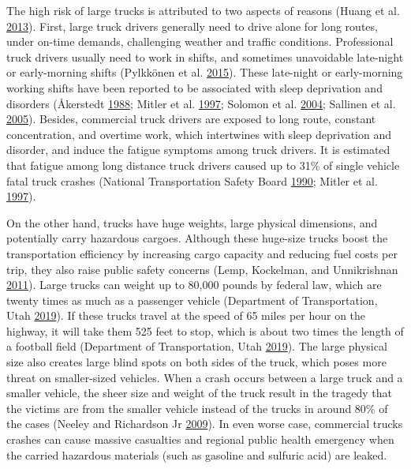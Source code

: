 \documentclass[12pt]{book}
\numberwithin{equation}{chapter}
\begin{document}
The high risk of large trucks is attributed to two aspects of reasons (Huang et al. \protect\hyperlink{ref-huang2013development}{2013}). First, large truck drivers generally need to drive alone for long routes, under on-time demands, challenging weather and traffic conditions. Professional truck drivers usually need to work in shifts, and sometimes unavoidable late-night or early-morning shifts (Pylkkönen et al. \protect\hyperlink{ref-pylkkonen2015sleepiness}{2015}). These late-night or early-morning working shifts have been reported to be associated with sleep deprivation and disorders (Åkerstedt \protect\hyperlink{ref-aakerstedt1988sleepiness}{1988}; Mitler et al. \protect\hyperlink{ref-mitler1997sleep}{1997}; Solomon et al. \protect\hyperlink{ref-solomon2004healthcare}{2004}; Sallinen et al. \protect\hyperlink{ref-sallinen2005sleepiness}{2005}). Besides, commercial truck drivers are exposed to long route, constant concentration, and overtime work, which intertwines with sleep deprivation and disorder, and induce the fatigue symptoms among truck drivers. It is estimated that fatigue among long distance truck drivers caused up to 31\% of single vehicle fatal truck crashes (National Transportation Safety Board \protect\hyperlink{ref-ntsb1990}{1990}; Mitler et al. \protect\hyperlink{ref-mitler1997sleep}{1997}).

On the other hand, trucks have huge weights, large physical dimensions, and potentially carry hazardous cargoes. Although these huge-size trucks boost the transportation efficiency by increasing cargo capacity and reducing fuel costs per trip, they also raise public safety concerns (Lemp, Kockelman, and Unnikrishnan \protect\hyperlink{ref-lemp2011analysis}{2011}). Large trucks can weight up to 80,000 pounds by federal law, which are twenty times as much as a passenger vehicle (Department of Transportation, Utah \protect\hyperlink{ref-utah2019}{2019}). If these trucks travel at the speed of 65 miles per hour on the highway, it will take them 525 feet to stop, which is about two times the length of a football field (Department of Transportation, Utah \protect\hyperlink{ref-utah2019}{2019}). The large physical size also creates large blind spots on both sides of the truck, which poses more threat on smaller-sized vehicles. When a crash occurs between a large truck and a smaller vehicle, the sheer size and weight of the truck result in the tragedy that the victims are from the smaller vehicle instead of the trucks in around 80\% of the cases (Neeley and Richardson Jr \protect\hyperlink{ref-neeley2009effect}{2009}). In even worse case, commercial trucks crashes can cause massive casualties and regional public health emergency when the carried hazardous materials (such as gasoline and sulfuric acid) are leaked.
\end{document}
